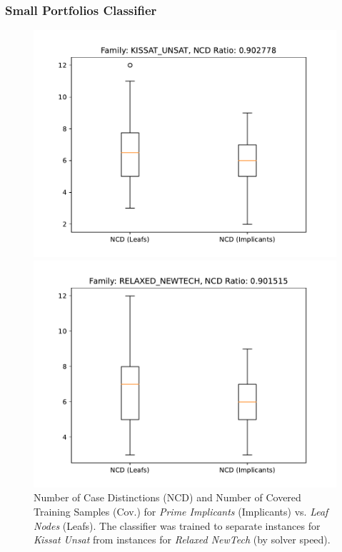 \documentclass[a4paper, USenglish, cleveref, autoref, thm-restate]{lipics-v2021}
\theoremstyle{definition}
\begin{document}
\subsubsection{Small Portfolios Classifier} 

\begin{figure}
\begin{minipage}{.49\linewidth}
\includegraphics[width=\linewidth]{fig2/dc2-kissat-unsat.pdf}
\end{minipage}
\begin{minipage}{.49\linewidth}
\includegraphics[width=\linewidth]{fig2/dc2-relaxed-newtech.pdf}
\end{minipage}
\caption{Number of Case Distinctions (NCD) and Number of Covered Training Samples (Cov.) for \emph{Prime Implicants} (Implicants) vs. \emph{Leaf Nodes} (Leafs). The classifier was trained to separate instances for \emph{Kissat Unsat} from instances for \emph{Relaxed NewTech} (by solver speed).}
\label{fig:eval:portfolio}
\end{figure}
\end{document}
